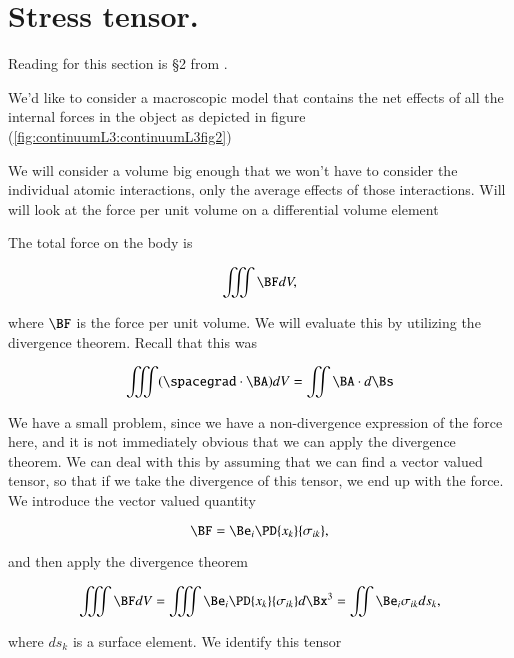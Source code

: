 \section{Stress tensor.}

Reading for this section is \S 2 from \citep{landau1960theory}.

We'd like to consider a macroscopic model that contains the net effects of all the internal forces in the object as depicted in figure (\ref{fig:continuumL3:continuumL3fig2})


We will consider a volume big enough that we won't have to consider the individual atomic interactions, only the average effects of those interactions.  Will will look at the force per unit volume on a differential volume element

The total force on the body is 

\begin{equation}\label{eqn:continuumL3:230}
\iiint \BF dV,
\end{equation}

where $\BF$ is the force per unit volume.  We will evaluate this by utilizing the divergence theorem.  Recall that this was

\begin{equation}\label{eqn:continuumL3:250}
\iiint (\spacegrad \cdot \BA) dV
= \iint \BA \cdot d\Bs
\end{equation}

We have a small problem, since we have a non-divergence expression of the force here, and it is not immediately obvious that we can apply the divergence theorem.  We can deal with this by assuming that we can find a vector valued tensor, so that if we take the divergence of this tensor, we end up with the force.  We introduce the vector valued quantity

\begin{equation}\label{eqn:continuumL3:270}
\BF = \Be_i \PD{x_k}{\sigma_{ik}},
\end{equation}

and then apply the divergence theorem

\begin{equation}\label{eqn:continuumL3:290}
\iiint \BF dV 
= \iiint \Be_i \PD{x_k}{\sigma_{ik}} d\Bx^3 
=
\iint \Be_i \sigma_{ik} ds_k,
\end{equation}

where $ds_k$ is a surface element.  We identify this tensor

